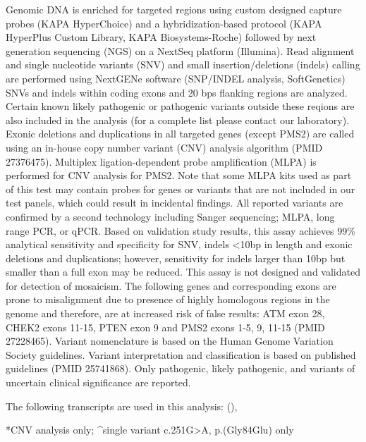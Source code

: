 \documentclass[9pt]{extarticle}
\newcommand{\data}[1]{}
\newenvironment{dataiter}[1]{}{}
\begin{document}
Genomic DNA is enriched for targeted regions using custom designed capture probes (KAPA HyperChoice) and a hybridization-based protocol (KAPA HyperPlus Custom Library, KAPA Biosystems-Roche) followed by next generation sequencing (NGS) on a NextSeq platform (Illumina). Read alignment and single nucleotide variants (SNV) and small insertion/deletions (indels) calling are performed using NextGENe software (SNP/INDEL analysis, SoftGenetics) SNVs and indels within coding exons and 20 bps flanking regions are analyzed. Certain known likely pathogenic or pathogenic variants outside these reqions are also included in the analysis (for a complete list please contact our laboratory). Exonic deletions and duplications in all targeted genes (except PMS2) are called using an in-house copy number variant (CNV) analysis algorithm (PMID 27376475).  Multiplex ligation-dependent probe amplification (MLPA) is performed for CNV analysis for PMS2. Note that some MLPA kits used as part of this test may contain probes for genes or variants that are not included in our test panels, which could result in incidental findings. All reported variants are confirmed by a second technology including Sanger sequencing; MLPA, long range PCR, or qPCR. Based on validation study results, this assay achieves 99\% analytical sensitivity and specificity for SNV, indels <10bp in length and exonic deletions and duplications; however, sensitivity for indels larger than 10bp but smaller than a full exon may be reduced. This assay is not designed and validated for detection of mosaicism. The following genes and corresponding exons are prone to misalignment due to presence of highly homologous regions in the genome and therefore, are at increased risk of false results: ATM exon 28, CHEK2 exons 11-15, PTEN exon 9 and PMS2 exons 1-5, 9, 11-15 (PMID 27228465). Variant nomenclature is based on the Human Genome Variation Society guidelines. Variant interpretation and classification is based on published guidelines (PMID 25741868). Only pathogenic, likely pathogenic, and variants of uncertain clinical significance are reported.

The following transcripts are used in this analysis: \begin{dataiter}{tested_genes} \data{gene_symbol} (\data{refseq_mrna}),\end{dataiter}

*CNV analysis only; \^{}single variant c.251G>A, p.(Gly84Glu) only
\end{document}
